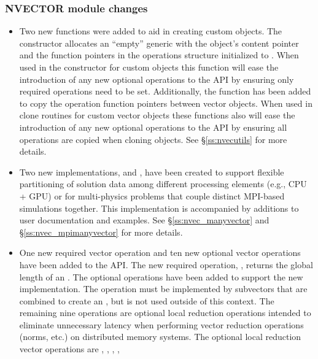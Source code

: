 \subsubsection*{NVECTOR module changes}

\begin{itemize}
\item Two new functions were added to aid in creating custom {\nvector} objects. The
constructor  allocates an ``empty'' generic {\nvector} with the
object's content pointer and the function pointers in the operations structure
initialized to . When used in the constructor for custom objects this
function will ease the introduction of any new optional operations to the
{\nvector} API by ensuring only required operations need to be set.
Additionally, the function  has been added to copy the
operation function pointers between vector objects. When used in clone routines
for custom vector objects these functions also will ease the introduction of
any new optional operations to the {\nvector} API by ensuring all operations
are copied when cloning objects. See \S\ref{ss:nvecutils} for more details.
%
\item Two new {\nvector} implementations, {\nvecmanyvector} and
{\nvecmpimanyvector}, have been created to support flexible partitioning
of solution data among different processing elements (e.g., CPU + GPU) or for
multi-physics problems that couple distinct MPI-based simulations together. This
implementation is accompanied by additions to user documentation and {\sundials}
examples. See \S\ref{ss:nvec_manyvector} and \S\ref{ss:nvec_mpimanyvector} for
more details.
%
\item One new required vector operation and ten new optional vector operations have
been added to the {\nvector} API. The new required operation, ,
returns the global length of an . The optional operations have
been added to support the new \newline\noindent
{\nvecmpimanyvector} implementation. The
operation  must be implemented by subvectors that are
combined to create an {\nvecmpimanyvector}, but is not used outside of
this context. The remaining nine operations are optional local reduction
operations intended to eliminate unnecessary latency when performing vector
reduction operations (norms, etc.) on distributed memory systems. The optional
local reduction vector operations are
,
,
,
,

\end{itemize}

